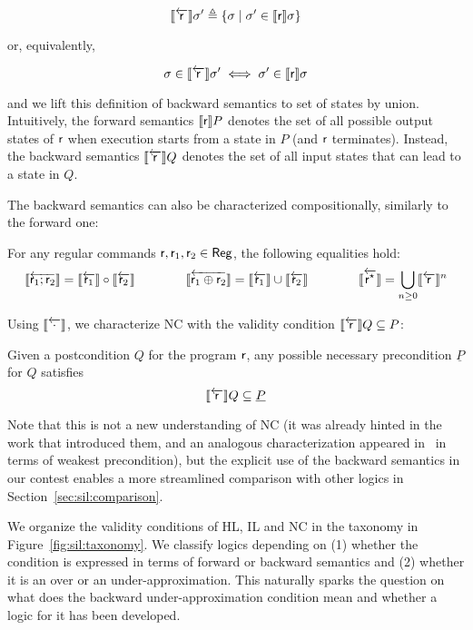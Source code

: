 \begin{equation}
	\llbracket\overleftarrow{\mathsf{r}}\rrbracket \sigma' \triangleq \{ \sigma \mid \sigma' \in \llbracket\mathsf{r}\rrbracket \sigma \} \label{eq:sil:bwsem-definition}
\end{equation}

\noindent or, equivalently,

\begin{equation}
	\sigma \in \llbracket\overleftarrow{\mathsf{r}}\rrbracket \sigma' \iff \sigma' \in \llbracket\mathsf{r}\rrbracket \sigma  \label{eq:sil:bwsem-sigma-sigma'}
\end{equation}

\noindent and we lift this definition of backward semantics to set of states by union.
Intuitively, the forward semantics $\llbracket\mathsf{r}\rrbracket P$ denotes the set of all possible output states of $\mathsf{r}$ when execution starts from a state in $P$ (and $\mathsf{r}$ terminates).
Instead, the backward semantics $\llbracket\overleftarrow{\mathsf{r}}\rrbracket Q$ denotes the set of all input states that can lead to a state in $Q$.

The backward semantics can also be characterized compositionally, similarly to the forward one:

\begin{lemma}\label{lmm:sil:bwsem-calculus}
	For any regular commands $\mathsf{r},\mathsf{r}_1,\mathsf{r}_2\in \mathsf{Reg}$, the following equalities hold:
	\[
	\llbracket\overleftarrow{\mathsf{r}_1; \mathsf{r}_2}\rrbracket = \llbracket\overleftarrow{\mathsf{r}_1}\rrbracket \circ \llbracket\overleftarrow{\mathsf{r}_2}\rrbracket \qquad\qquad
	\llbracket\overleftarrow{\mathsf{r}_1 \oplus \mathsf{r}_2}\rrbracket = \llbracket\overleftarrow{\mathsf{r}_1}\rrbracket \cup \llbracket\overleftarrow{\mathsf{r}_2}\rrbracket \qquad\qquad
	\llbracket\overleftarrow{{\mathsf{r}^\star}}\rrbracket = \bigcup\limits_{n \ge 0} \llbracket\overleftarrow{\mathsf{r}}\rrbracket^n
	\]
\end{lemma}

Using $\llbracket\overleftarrow{\cdot}\rrbracket$, we characterize NC with the validity condition $\llbracket\overleftarrow{\mathsf{r}}\rrbracket Q \subseteq P$:

\begin{prop}\label{prop:sil:nc}
	Given a postcondition $Q$ for the program $\mathsf{r}$, any possible necessary precondition $\underline{P}$ for $Q$ satisfies
	\[
	\llbracket\overleftarrow{\mathsf{r}}\rrbracket Q \subseteq \underline{P}
	\]
\end{prop}

Note that this is not a new understanding of NC (it was already hinted in the work that introduced them, and an analogous characterization appeared in~\cite[§6.3]{ZK22} in terms of weakest precondition), but the explicit use of the backward semantics in our contest enables a more streamlined comparison with other logics in Section~\ref{sec:sil:comparison}.

We organize the validity conditions of HL, IL and NC in the taxonomy in Figure~\ref{fig:sil:taxonomy}. We classify logics depending on (1) whether the condition is expressed in terms of forward or backward semantics and (2) whether it is an over or an under-approximation.
This naturally sparks the question on what does the backward under-approximation condition mean and whether a logic for it has been developed.

